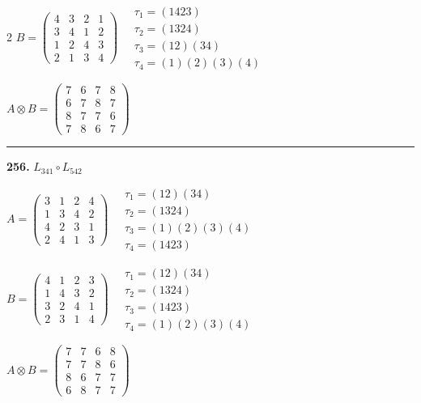 \begin{multicols}{2}
$B = \begin{pmatrix} 4 & 3 & 2 & 1 \\ 3 & 4 & 1 & 2 \\ 1 & 2 & 4 & 3 \\ 2 & 1 & 3 & 4 \end{pmatrix} \quad \begin{matrix} \tau_{1}=(1 4 2 3) \\ \tau_{2}=(1 3 2 4) \\ \tau_{3}=(1 2)(3 4) \\ \tau_{4}=(1)(2)(3)(4) \end{matrix}$

$A \otimes B = \begin{pmatrix} 7 & 6 & 7 & 8 \\ 6 & 7 & 8 & 7 \\ 8 & 7 & 7 & 6 \\ 7 & 8 & 6 & 7 \end{pmatrix}$

\vspace{0.3em}
\hrule
\vspace{0.3em}

\noindent\textbf{256.} $L_{341} \circ L_{542}$

$A = \begin{pmatrix} 3 & 1 & 2 & 4 \\ 1 & 3 & 4 & 2 \\ 4 & 2 & 3 & 1 \\ 2 & 4 & 1 & 3 \end{pmatrix} \quad \begin{matrix} \tau_{1}=(1 2)(3 4) \\ \tau_{2}=(1 3 2 4) \\ \tau_{3}=(1)(2)(3)(4) \\ \tau_{4}=(1 4 2 3) \end{matrix}$

$B = \begin{pmatrix} 4 & 1 & 2 & 3 \\ 1 & 4 & 3 & 2 \\ 3 & 2 & 4 & 1 \\ 2 & 3 & 1 & 4 \end{pmatrix} \quad \begin{matrix} \tau_{1}=(1 2)(3 4) \\ \tau_{2}=(1 3 2 4) \\ \tau_{3}=(1 4 2 3) \\ \tau_{4}=(1)(2)(3)(4) \end{matrix}$

$A \otimes B = \begin{pmatrix} 7 & 7 & 6 & 8 \\ 7 & 7 & 8 & 6 \\ 8 & 6 & 7 & 7 \\ 6 & 8 & 7 & 7 \end{pmatrix}$


\end{multicols}
